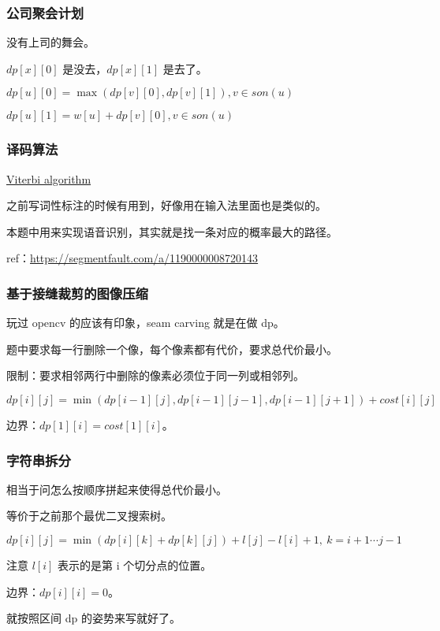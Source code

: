 \subsubsection{公司聚会计划}

没有上司的舞会。

$dp[x][0]$ 是没去，$dp[x][1]$ 是去了。

$dp[u][0] = \max(dp[v][0], dp[v][1]), v \in son(u)$

$dp[u][1] = w[u] + dp[v][0], v \in son(u)$

\subsubsection{译码算法}

\href{https://en.wikipedia.org/wiki/Viterbi_algorithm}{Viterbi algorithm}

之前写词性标注的时候有用到，好像用在输入法里面也是类似的。

本题中用来实现语音识别，其实就是找一条对应的概率最大的路径。

ref：\url{https://segmentfault.com/a/1190000008720143}

\subsubsection{基于接缝裁剪的图像压缩}

玩过 opencv 的应该有印象，seam carving 就是在做 dp。

题中要求每一行删除一个像，每个像素都有代价，要求总代价最小。

限制：要求相邻两行中删除的像素必须位于同一列或相邻列。

$dp[i][j] = \min(dp[i - 1][j], dp[i - 1][j - 1], dp[i - 1][j + 1]) + cost[i][j]$

边界：$dp[1][i] = cost[1][i]$。

\subsubsection{字符串拆分}

相当于问怎么按顺序拼起来使得总代价最小。

等价于之前那个最优二叉搜索树。

$dp[i][j] = \min(dp[i][k] + dp[k][j]) + l[j] - l[i] + 1,\ k = i + 1 \cdots j - 1$

注意 $l[i]$ 表示的是第 i 个切分点的位置。

边界：$dp[i][i] = 0$。

就按照区间 dp 的姿势来写就好了。

